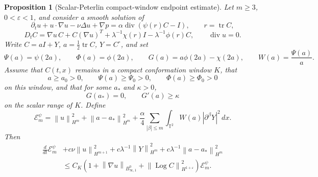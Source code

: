 \documentclass[11pt]{article}
\newtheorem{proposition}{Proposition}[section]
\newcommand{\T}{\mathbb T}
\newcommand{\tr}{\operatorname{tr}}
\newcommand{\divv}{\operatorname{div}}
\newcommand{\Log}{\operatorname{Log}}
\newcommand{\calE}{\mathcal E}
\newcommand{\eps}{\varepsilon}
\newcommand{\norm}[1]{\left\lVert #1\right\rVert}
\newcommand{\Besov}{B^0_{\infty,1}}
\begin{document}
\begin{proposition}[Scalar-Peterlin compact-window endpoint estimate]
\label{prop:scalar-peterlin-endpoint}
Let \(m\ge3\), \(0<\eps<1\), and consider a smooth solution of
\[
  \partial_tu+u\cdot\nabla u-\nu\Delta u+\nabla p
  =\alpha\divv(\psi(r)C-I),\qquad r=\tr C,
\]
\[
  D_tC=\nabla u\,C+C(\nabla u)^T
  +\lambda^{-1}\chi(r)I-\lambda^{-1}\phi(r)C,
  \qquad \divv u=0.
\]
Write \(C=aI+Y\), \(a=\frac12\tr C\), \(Y=C^\circ\), and set
\[
  \Psi(a)=\psi(2a),\qquad \Phi(a)=\phi(2a),\qquad
  G(a)=a\phi(2a)-\chi(2a),\qquad W(a)=\frac{\Psi(a)}{a}.
\]
Assume that \(C(t,x)\) remains in a compact conformation window \(K\), that
\[
  a\ge a_0>0,\qquad \Psi(a)\ge\Psi_0>0,\qquad \Phi(a)\ge\Phi_0>0
\]
on this window, and that for some \(a_*\) and \(\kappa>0\),
\[
  G(a_*)=0,\qquad G'(a)\ge\kappa
\]
on the scalar range of \(K\).  Define
\[
  \calE_m^\psi
  =\norm{u}_{H^m}^2+\norm{a-a_*}_{H^m}^2
  +\frac{\alpha}{4}\sum_{|\beta|\le m}
  \int_{\T^2} W(a)|\partial^\beta Y|^2\,dx .
\]
Then
\begin{equation}
\label{eq:scalar-peterlin-endpoint}
\begin{aligned}
  \frac{d}{dt}\calE_m^\psi
  &+c\nu\norm{u}_{H^{m+1}}^2
    +c\lambda^{-1}\norm{Y}_{H^m}^2
    +c\lambda^{-1}\norm{a-a_*}_{H^m}^2  \\
  &\le
  C_K\left(1+\norm{\nabla u}_{\Besov}
  +\norm{\Log C}_{H^{1+\eps}}^2\right)\calE_m^\psi .
\end{aligned}
\end{equation}
\end{proposition}
\end{document}
